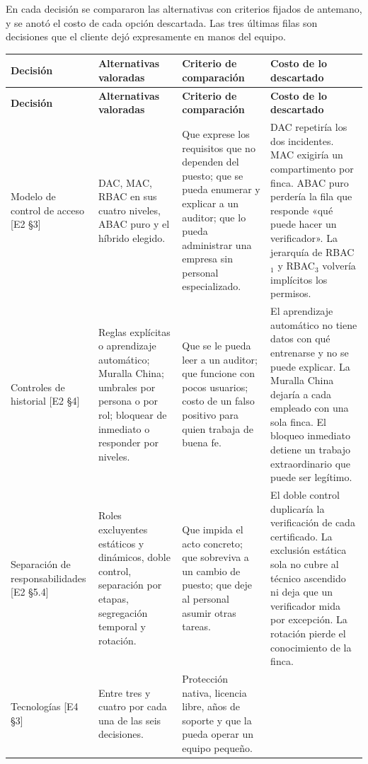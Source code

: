 \documentclass[11pt,letterpaper]{article}
\newcommand{\cab}[1]{\textbf{\rmfamily #1}}
\newcommand{\ev}[1]{\textrm{\small [#1]}}   %
\begin{document}
En cada decisión se compararon las alternativas con criterios fijados de antemano, y se anotó el costo
de cada opción descartada. Las tres últimas filas son decisiones que el cliente dejó expresamente en
manos del equipo.

{\small
\renewcommand{\arraystretch}{1.25}
\begin{longtable}{@{}L{2.4cm} L{3.9cm} L{3.9cm} L{5.0cm}@{}}
\toprule
\cab{Decisión} & \cab{Alternativas valoradas} & \cab{Criterio de comparación} & \cab{Costo de lo descartado} \\
\midrule
\endfirsthead
\toprule
\cab{Decisión} & \cab{Alternativas valoradas} & \cab{Criterio de comparación} & \cab{Costo de lo descartado} \\
\midrule
\endhead
\bottomrule
\endfoot
Modelo de control de acceso \ev{E2 §3} &
DAC, MAC, RBAC en sus cuatro niveles, ABAC puro y el híbrido elegido. &
Que exprese los requisitos que no dependen del puesto; que se pueda enumerar y explicar a un auditor; que lo pueda administrar una empresa sin personal especializado. &
DAC repetiría los dos incidentes. MAC exigiría un compartimento por finca. ABAC puro perdería la fila que responde «qué puede hacer un verificador». La jerarquía de RBAC$_1$ y RBAC$_3$ volvería implícitos los permisos. \\
Controles de historial \ev{E2 §4} &
Reglas explícitas o aprendizaje automático; Muralla China; umbrales por persona o por rol; bloquear de inmediato o responder por niveles. &
Que se le pueda leer a un auditor; que funcione con pocos usuarios; costo de un falso positivo para quien trabaja de buena fe. &
El aprendizaje automático no tiene datos con qué entrenarse y no se puede explicar. La Muralla China dejaría a cada empleado con una sola finca. El bloqueo inmediato detiene un trabajo extraordinario que puede ser legítimo. \\
Separación de responsabilidades \ev{E2 §5.4} &
Roles excluyentes estáticos y dinámicos, doble control, separación por etapas, segregación temporal y rotación. &
Que impida el acto concreto; que sobreviva a un cambio de puesto; que deje al personal asumir otras tareas. &
El doble control duplicaría la verificación de cada certificado. La exclusión estática sola no cubre al técnico ascendido ni deja que un verificador mida por excepción. La rotación pierde el conocimiento de la finca. \\
Tecnologías \ev{E4 §3} &
Entre tres y cuatro por cada una de las seis decisiones. &
Protección nativa, licencia libre, años de soporte y que la pueda operar un equipo pequeño. &

\end{longtable}}
\end{document}
